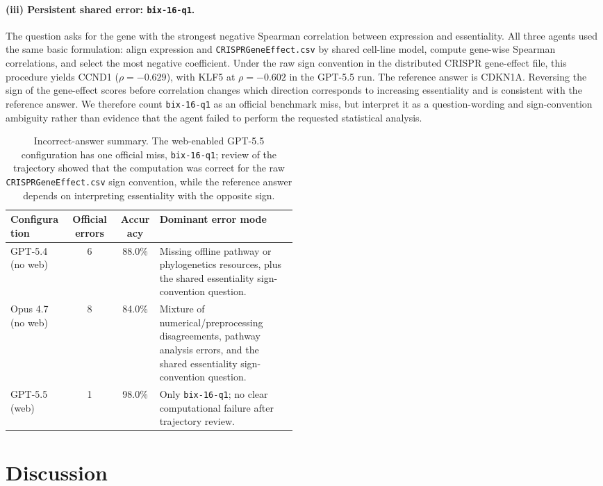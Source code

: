 \documentclass[11pt]{article}
\begin{document}
\paragraph{(iii) Persistent shared error: \texttt{bix-16-q1}.} The
question asks for the gene with the strongest negative Spearman
correlation between expression and essentiality. All three agents used the
same basic formulation: align expression and \texttt{CRISPRGeneEffect.csv}
by shared cell-line model, compute gene-wise Spearman correlations, and
select the most negative coefficient. Under the raw sign convention in the
distributed CRISPR gene-effect file, this procedure yields CCND1
($\rho=-0.629$), with KLF5 at $\rho=-0.602$ in the GPT-5.5 run. The
reference answer is CDKN1A. Reversing the sign of the gene-effect scores
before correlation changes which direction corresponds to increasing
essentiality and is consistent with the reference answer. We therefore
count \texttt{bix-16-q1} as an official benchmark miss, but interpret it
as a question-wording and sign-convention ambiguity rather than evidence
that the agent failed to perform the requested statistical analysis.

\begin{table}[ht]
\centering
\caption{Incorrect-answer summary. The web-enabled GPT-5.5 configuration
has one official miss, \texttt{bix-16-q1}; review of the trajectory showed
that the computation was correct for the raw \texttt{CRISPRGeneEffect.csv}
sign convention, while the reference answer depends on interpreting
essentiality with the opposite sign.}
\label{tab:errors}
\begin{tabular}{lccp{0.48\linewidth}}
\toprule
Configuration & Official errors & Accuracy & Dominant error mode \\
\midrule
GPT-5.4 (no web) & 6 & 88.0\% &
Missing offline pathway or phylogenetics resources, plus the shared
essentiality sign-convention question. \\
Opus 4.7 (no web) & 8 & 84.0\% &
Mixture of numerical/preprocessing disagreements, pathway analysis errors,
and the shared essentiality sign-convention question. \\
GPT-5.5 (web) & 1 & 98.0\% &
Only \texttt{bix-16-q1}; no clear computational failure after trajectory
review. \\
\bottomrule
\end{tabular}
\end{table}

\section{Discussion}\label{sec:discussion}
\end{document}
